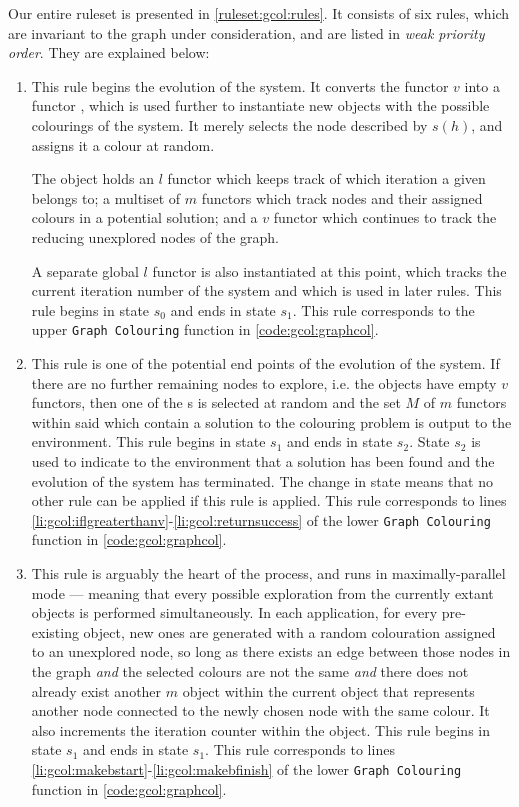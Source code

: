 Our entire ruleset is presented in \autoref{ruleset:gcol:rules}.  It consists of six rules, which are invariant to the graph under consideration, and are listed in \emph{weak priority order}.  They are explained below:

\begin{enumerate}
\item This rule begins the evolution of the system.  It converts the functor \(v\) into a functor \bo{}, which is used further to instantiate new objects with the possible colourings of the system.  It merely selects the node described by \(s(h)\), and assigns it a colour at random.

The \bo{} object holds an \(l\) functor which keeps track of which iteration a given \bo{} belongs to; a multiset of \(m\) functors which track nodes and their assigned colours in a potential solution; and a \(v\) functor which continues to track the reducing unexplored nodes of the graph.

A separate global \(l\) functor is also instantiated at this point, which tracks the current iteration number of the system and which is used in later rules.  This rule begins in state \(s_0\) and ends in state \(s_1\).  This rule corresponds to the upper \texttt{Graph Colouring} function in \autoref{code:gcol:graphcol}.

\item This rule is one of the potential end points of the evolution of the system.  If there are no further remaining nodes to explore, i.e. the \bo{} objects have empty \(v\) functors, then one of the \bo{}s is selected at random and the set \(M\) of \(m\) functors within said \bo{} which contain a solution to the colouring problem is output to the environment.  This rule begins in state \(s_1\) and ends in state \(s_2\).  State \(s_2\) is used to indicate to the environment that a solution has been found and the evolution of the system has terminated.  The change in state means that no other rule can be applied if this rule is applied.  This rule corresponds to lines \ref{li:gcol:iflgreaterthanv}-\ref{li:gcol:returnsuccess} of the lower \texttt{Graph Colouring} function in \autoref{code:gcol:graphcol}.

\item This rule is arguably the heart of the process, and runs in maximally-parallel mode --- meaning that every possible exploration from the currently extant \bo{} objects is performed simultaneously.  In each application, for every pre-existing \bo{} object, new ones are generated with a random colouration assigned to an unexplored node, so long as there exists an edge between those nodes in the graph \emph{and} the selected colours are not the same \emph{and} there does not already exist another \(m\) object within the current \bo{} object that represents another node connected to the newly chosen node with the same colour.  It also increments the iteration counter within the \bo{} object.  This rule begins in state \(s_1\) and ends in state \(s_1\).  This rule corresponds to lines \ref{li:gcol:makebstart}-\ref{li:gcol:makebfinish} of the lower \texttt{Graph Colouring} function in \autoref{code:gcol:graphcol}.


\end{enumerate}
